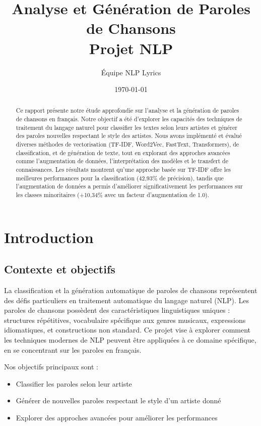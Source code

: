 \documentclass[a4paper,11pt]{article}
\title{\textbf{Analyse et Génération de Paroles de Chansons\\
Projet NLP}}
\author{Équipe NLP Lyrics}
\date{\today}
\begin{document}
\maketitle

\begin{abstract}
Ce rapport présente notre étude approfondie sur l'analyse et la génération de paroles de chansons en français. Notre objectif a été d'explorer les capacités des techniques de traitement du langage naturel pour classifier les textes selon leurs artistes et générer des paroles nouvelles respectant le style des artistes. Nous avons implémenté et évalué diverses méthodes de vectorisation (TF-IDF, Word2Vec, FastText, Transformers), de classification, et de génération de texte, tout en explorant des approches avancées comme l'augmentation de données, l'interprétation des modèles et le transfert de connaissances. Les résultats montrent qu'une approche basée sur TF-IDF offre les meilleures performances pour la classification (42,93\% de précision), tandis que l'augmentation de données a permis d'améliorer significativement les performances sur les classes minoritaires (+10,34\% avec un facteur d'augmentation de 1.0).
\end{abstract}

\tableofcontents
\newpage

\section{Introduction}
\subsection{Contexte et objectifs}
La classification et la génération automatique de paroles de chansons représentent des défis particuliers en traitement automatique du langage naturel (NLP). Les paroles de chansons possèdent des caractéristiques linguistiques uniques : structures répétitives, vocabulaire spécifique aux genres musicaux, expressions idiomatiques, et constructions non standard. Ce projet vise à explorer comment les techniques modernes de NLP peuvent être appliquées à ce domaine spécifique, en se concentrant sur les paroles en français.

Nos objectifs principaux sont :
\begin{itemize}
    \item Classifier les paroles selon leur artiste
    \item Générer de nouvelles paroles respectant le style d'un artiste donné
    \item Explorer des approches avancées pour améliorer les performances
\end{itemize}
\end{document}
